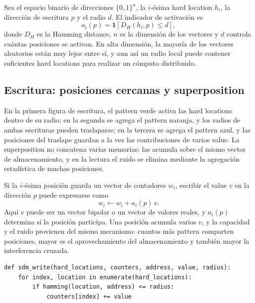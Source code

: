Sea el espacio binario de direcciones $\{0,1\}^{n}$, la $i$-ésima hard location $h_i$, la dirección de escritura $p$ y el radio $d$. El indicador de activación es
$$
a_i(p)=\mathbf{1}\!\left[D_H(h_i,p)\le d\right],
$$
donde $D_H$ es la Hamming distance, $n$ es la dimensión de los vectores y $d$ controla cuántas posiciones se activan. En alta dimensión, la mayoría de los vectores aleatorios están muy lejos entre sí, y aun así un radio local puede contener suficientes hard locations para realizar un cómputo distribuido.

\subsection{Escritura: posiciones cercanas y superposition}

En la primera figura de escritura, el pattern verde activa las hard locations dentro de su radio; en la segunda se agrega el pattern naranja, y los radios de ambas escrituras pueden traslaparse; en la tercera se agrega el pattern azul, y las posiciones del traslape guardan a la vez las contribuciones de varios value. La superposition no concatena varias memorias: las acumula sobre el mismo vector de almacenamiento, y en la lectura el ruido se elimina mediante la agregación estadística de muchas posiciones.




Si la $i$-ésima posición guarda un vector de contadores $w_i$, escribir el value $v$ en la dirección $p$ puede expresarse como
$$
w_i\leftarrow w_i+a_i(p)\,v.
$$
Aquí $v$ puede ser un vector bipolar o un vector de valores reales, y $a_i(p)$ determina si la posición participa. Una posición acumula varios $v$, y la capacidad y el ruido provienen del mismo mecanismo: cuantos más pattern comparten posiciones, mayor es el aprovechamiento del almacenamiento y también mayor la interferencia cruzada.

\begin{lstlisting}[caption={Escritura distribuida de SDM (pseudocódigo conceptual)}]
def sdm_write(hard_locations, counters, address, value, radius):
    for index, location in enumerate(hard_locations):
        if hamming(location, address) <= radius:
            counters[index] += value
\end{lstlisting}

